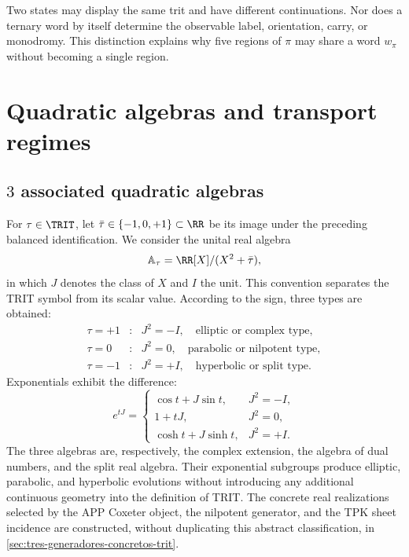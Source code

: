 \begin{remark}
Two states may display the same trit and have different continuations.
Nor does a ternary word by itself determine the observable label,
orientation, carry, or
monodromy. This distinction explains why five regions of \(\pi\) may
share a word \(w_\pi\) without becoming a single region.
\end{remark}

\fi

\ifdefined\HMTTRITDevelopments
\chapter{Quadratic algebras and transport regimes}
\label{chap:trit-algebras}

\section{\(3\) associated quadratic algebras}

For \(\tau\in\TRIT\), let \(\bar\tau\in\{-1,0,+1\}\subset\RR\) be its
image under the preceding balanced identification. We consider the unital real
algebra
\[
\mathbb A_\tau=\RR[X]/(X^2+\bar\tau),
\]
in which \(J\) denotes the class of \(X\) and
\(I\) the unit. This convention separates the TRIT symbol from its
scalar value. According to the sign, three types are obtained:
\[
\begin{array}{ccl}
\tau=+1&:&J^2=-I,\quad\text{elliptic or complex type},\\
\tau=0&:&J^2=0,\quad\text{parabolic or nilpotent type},\\
\tau=-1&:&J^2=+I,\quad\text{hyperbolic or split type}.
\end{array}
\]
Exponentials exhibit the difference:
\[
e^{tJ}=
\begin{cases}
\cos t+J\sin t,&J^2=-I,\\
1+tJ,&J^2=0,\\
\cosh t+J\sinh t,&J^2=+I.
\end{cases}
\]
The three algebras are, respectively, the complex extension, the algebra of dual numbers, and the split real algebra. Their exponential subgroups produce elliptic, parabolic, and hyperbolic evolutions without introducing any additional continuous geometry into the definition of TRIT\@. The concrete real realizations selected by the APP Coxeter object, the nilpotent generator, and the TPK sheet incidence are constructed, without duplicating this abstract classification, in \cref{sec:tres-generadores-concretos-trit}.

